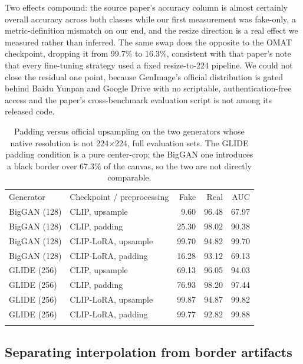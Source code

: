 \documentclass[3p,times,procedia]{elsarticle}
\begin{document}
Two effects compound: the source paper's accuracy column is almost
certainly overall accuracy across both classes while our first measurement
was fake-only, a metric-definition mismatch on our end, and the resize
direction is a real effect we measured rather than inferred. The same swap
does the opposite to the OMAT checkpoint, dropping it from 99.7\% to
16.3\%, consistent with that paper's note that every fine-tuning strategy
used a fixed resize-to-224 pipeline. We could not close the residual one
point, because GenImage's official distribution is gated behind Baidu
Yunpan and Google Drive with no scriptable, authentication-free access and
the paper's cross-benchmark evaluation script is not among its released
code.

\begin{table}[h]
\caption{Padding versus official upsampling on the two generators whose
native resolution is not 224$\times$224, full evaluation sets. The GLIDE
padding condition is a pure center-crop; the BigGAN one introduces a black
border over 67.3\% of the canvas, so the two are not directly comparable.}
\label{tab:glidepreproc}
\begin{tabular*}{\hsize}{@{\extracolsep{\fill}}llrrr@{}}
\toprule
Generator & Checkpoint / preprocessing & Fake & Real & AUC \\
\colrule
BigGAN (128) & CLIP, upsample & 9.60 & 96.48 & 67.97 \\
BigGAN (128) & CLIP, padding & 25.30 & 98.02 & 90.38 \\
BigGAN (128) & CLIP-LoRA, upsample & 99.70 & 94.82 & 99.70 \\
BigGAN (128) & CLIP-LoRA, padding & 16.28 & 93.12 & 69.13 \\
GLIDE (256) & CLIP, upsample & 69.13 & 96.05 & 94.03 \\
GLIDE (256) & CLIP, padding & 76.93 & 98.20 & 97.44 \\
GLIDE (256) & CLIP-LoRA, upsample & 99.87 & 94.87 & 99.82 \\
GLIDE (256) & CLIP-LoRA, padding & 99.77 & 92.82 & 99.88 \\
\botrule
\end{tabular*}
\end{table}

\subsection{Separating interpolation from border artifacts}
\label{sec:disentangle}
\end{document}
